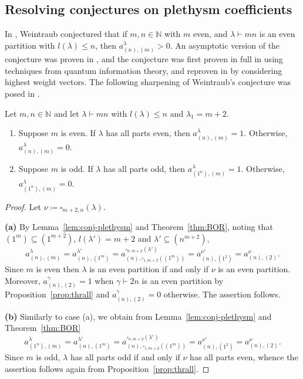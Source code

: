 \documentclass[ALCO, Unicode]{cedram}
\newcommand{\N}{\mathbb{N}}
\begin{document}
\subsection{Resolving conjectures on plethysm coefficients}\label{sec:resolve}
In \cite{W}, Weintraub conjectured that if $m,n\in\N$ with $m$ even, and $\lambda\vdash mn$ is an even partition with $l(\lambda)\le n$, then $a^\lambda_{(n),(m)}>0$. An asymptotic version of the conjecture was proven in \cite{Man}, and the conjecture was first proven in full in \cite{BCI} using techniques from quantum information theory, and reproven in \cite{MM} by considering highest weight vectors. The following sharpening of Weintraub's conjecture was posed in \cite[Conjecture 6.5.1]{dB-thesis}.

\begin{theorem}\label{thm:6.5.1}
	Let $m,n\in\N$ and let $\lambda\vdash mn$ with $l(\lambda)\le n$ and $\lambda_1=m+2$.
	\begin{enumerate}[label=\textup{(\alph*)}]
		\item Suppose $m$ is even. If $\lambda$ has all parts even, then $a^\lambda_{(n),(m)}=1$. Otherwise, $a^\lambda_{(n),(m)}=0$.
		\item Suppose $m$ is odd. If $\lambda$ has all parts odd, then $a^\lambda_{(1^n),(m)}=1$. Otherwise, $a^\lambda_{(1^n),(m)}=0$.
	\end{enumerate}
\end{theorem}

\begin{proof}
	Let $\nu\coloneqq \square_{m+2,n}(\lambda)$. 
	
	\noindent\textbf{(a)} By Lemma~\ref{lem:conj-plethysm} and Theorem~\ref{thm:BOR}, noting that $(1^m)\subseteq(1^{m+2})$, $l(\lambda')=m+2$ and $\lambda'\subseteq (n^{m+2})$,
	\[ a^\lambda_{(n),(m)} = a^{\lambda'}_{(n),(1^m)} = a^{\square_{n,m+2}(\lambda')}_{(n),\square_{1,m+2}((1^m))} = a^{\nu'}_{(n),(1^2)} = a^\nu_{(n),(2)}. \]
	Since $m$ is even then $\lambda$ is an even partition if and only if $\nu$ is an even partition. Moreover, $a^\gamma_{(n),(2)}=1$ when $\gamma\vdash 2n$ is an even partition by Proposition~\ref{prop:thrall} and $a^\gamma_{(n),(2)}=0$ otherwise. The assertion follows.
	
	\noindent\textbf{(b)} Similarly to case (a), we obtain from Lemma~\ref{lem:conj-plethysm} and Theorem~\ref{thm:BOR}
	\[ a^\lambda_{(1^n),(m)} = a^{\lambda'}_{(n),(1^m)} = a^{\square_{n,m+2}(\lambda')}_{(n),\square_{1,m+2}((1^m))} = a^{\nu'}_{(n),(1^2)} = a^\nu_{(n),(2)}. \]
	Since $m$ is odd, $\lambda$ has all parts odd if and only if $\nu$ has all parts even, whence the assertion follows again from Proposition~\ref{prop:thrall}.
\end{proof}
\end{document}

